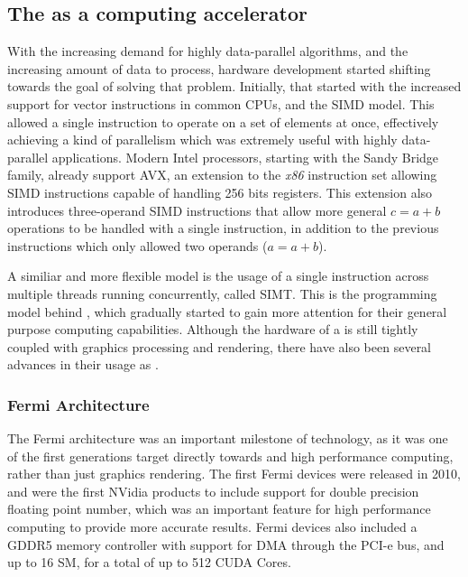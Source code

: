 \documentclass[main.tex]{subfiles}
\begin{document}
\subsection{The \gpu as a computing accelerator}

With the increasing demand for highly data-parallel algorithms, and the increasing amount of data to process, hardware development started shifting towards the goal of solving that problem. Initially, that started with the increased support for vector instructions in common \acsp{CPU}, and the \acs{SIMD} model. This allowed a single instruction to operate on a set of elements at once, effectively achieving a kind of parallelism which was extremely useful with highly data-parallel applications. Modern Intel processors, starting with the Sandy Bridge family, already support \ac{AVX}, an extension to the \textit{x86} instruction set allowing \acs{SIMD} instructions capable of handling 256 bits registers. This extension also introduces three-operand \acs{SIMD} instructions that allow more general $c = a + b$ operations to be handled with a single instruction, in addition to the previous instructions which only allowed two operands ($a = a + b$).

A similiar and more flexible model is the usage of a single instruction across multiple threads running concurrently, called \ac{SIMT}. This is the programming model behind \gpus, which gradually started to gain more attention for their general purpose computing capabilities. Although the hardware of a \gpus is still tightly coupled with graphics processing and rendering, there have also been several advances in their usage as \gpgpus.


\subsubsection{Fermi Architecture}

The Fermi architecture was an important milestone of \gpus technology, as it was one of the first generations target directly towards \gpgpu and high performance computing, rather than just graphics rendering. The first Fermi devices were released in 2010, and were the first NVidia products to include support for double precision floating point number, which was an important feature for high performance computing to provide more accurate results. Fermi devices also included a GDDR5 memory controller with support for \ac{DMA} through the \acs{PCI-e} bus, and up to 16 \acf{SM}, for a total of up to 512 \acs{CUDA} Cores.
\end{document}
